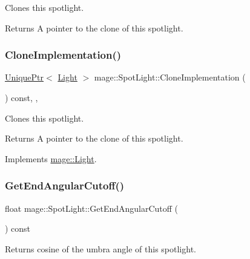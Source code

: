 Clones this spotlight.

\begin{DoxyReturn}{Returns}
A pointer to the clone of this spotlight. 
\end{DoxyReturn}
\hypertarget{classmage_1_1_spot_light_a060044ae1de97143878ad26524f03709}{}\label{classmage_1_1_spot_light_a060044ae1de97143878ad26524f03709} 
\subsubsection{\texorpdfstring{Clone\+Implementation()}{CloneImplementation()}}
{\footnotesize\ttfamily \hyperlink{namespacemage_a8c307fbcc33bce9b7f2aa4c26c3b95cf}{Unique\+Ptr}$<$ \hyperlink{classmage_1_1_light}{Light} $>$ mage\+::\+Spot\+Light\+::\+Clone\+Implementation (\begin{DoxyParamCaption}{ }\end{DoxyParamCaption}) const\hspace{0.3cm}{\ttfamily [override]}, {\ttfamily [private]}, {\ttfamily [virtual]}}

Clones this spotlight.

\begin{DoxyReturn}{Returns}
A pointer to the clone of this spotlight. 
\end{DoxyReturn}


Implements \hyperlink{classmage_1_1_light_aa613d76a1ebda69efde853d15f75490c}{mage\+::\+Light}.

\hypertarget{classmage_1_1_spot_light_a76b4bbc6b9f7b3f80e3ab664d12c4c11}{}\label{classmage_1_1_spot_light_a76b4bbc6b9f7b3f80e3ab664d12c4c11} 
\subsubsection{\texorpdfstring{Get\+End\+Angular\+Cutoff()}{GetEndAngularCutoff()}}
{\footnotesize\ttfamily float mage\+::\+Spot\+Light\+::\+Get\+End\+Angular\+Cutoff (\begin{DoxyParamCaption}{ }\end{DoxyParamCaption}) const}

Returns cosine of the umbra angle of this spotlight.

